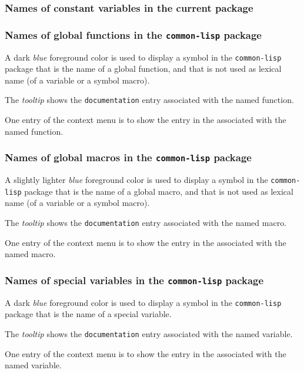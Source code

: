 \subsubsection{Names of constant variables in the current package}

\subsubsection{Names of global functions in the \texttt{common-lisp} package}

A dark \emph{blue} foreground color is used to display a symbol in the
\texttt{common-lisp} package that is the name of a global function,
and that is not used as lexical name (of a variable or a symbol
macro).

The \emph{tooltip} shows the \texttt{documentation} entry associated
with the named function.

One entry of the context menu is to show the entry in the \hs{}
associated with the named function.

\subsubsection{Names of global macros in the \texttt{common-lisp} package}

A slightly lighter \emph{blue} foreground color is used to display a
symbol in the \texttt{common-lisp} package that is the name of a
global macro, and that is not used as lexical name (of a variable or a
symbol macro).

The \emph{tooltip} shows the \texttt{documentation} entry associated
with the named macro.

One entry of the context menu is to show the entry in the \hs{}
associated with the named macro.

\subsubsection{Names of special variables in the \texttt{common-lisp} package}

A dark \emph{blue} foreground color is used to display a symbol in the
\texttt{common-lisp} package that is the name of a special variable.

The \emph{tooltip} shows the \texttt{documentation} entry associated
with the named variable.

One entry of the context menu is to show the entry in the \hs{}
associated with the named variable.

